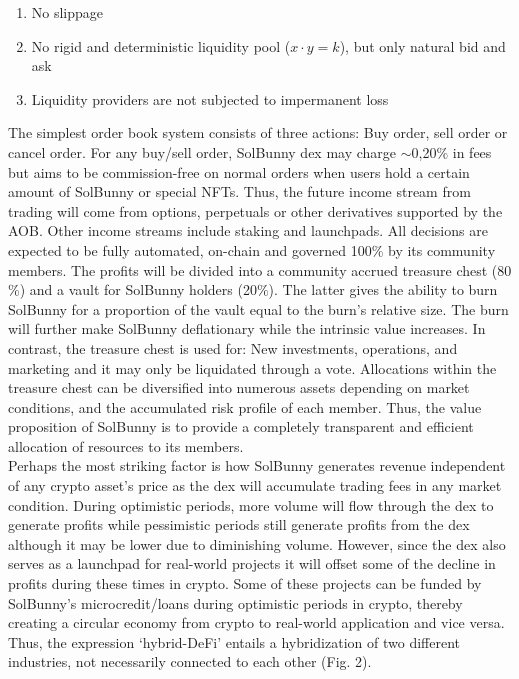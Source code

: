 \documentclass[12pt]{article}
\begin{document}
\begin{enumerate}

\item No slippage

\item No rigid and deterministic liquidity pool ($x \cdot y = k$), but only natural bid and ask

\item Liquidity providers are not subjected to impermanent loss\cite{il}

\end{enumerate}

The simplest order book system consists of three actions: Buy order, sell order or cancel order. For any buy/sell order, SolBunny dex may charge $\sim$0,20$\%$ in fees but aims to be commission-free on normal orders when users hold a certain amount of SolBunny or special NFTs. Thus, the future income stream from trading will come from options, perpetuals or other derivatives supported by the AOB. Other income streams include staking and launchpads. All decisions are expected to be fully automated, on-chain and governed 100$\%$ by its community members. The profits will be divided into a community accrued treasure chest (80$\%$) and a vault for SolBunny holders (20$\%$). The latter gives the ability to burn \cite{burn} SolBunny for a proportion of the vault equal to the burn's relative size. The burn will further make SolBunny deflationary while the intrinsic value increases. In contrast, the treasure chest is used for: New investments, operations, and marketing and it may only be liquidated through a vote. Allocations within the treasure chest can be diversified into numerous assets depending on market conditions, and the accumulated risk profile of each member. Thus, the value proposition of SolBunny is to provide a completely transparent and efficient allocation of resources to its members. \\

Perhaps the most striking factor is how SolBunny generates revenue independent of any crypto asset's price as the dex will accumulate trading fees in any market condition. During optimistic periods, more volume will flow through the dex to generate profits while pessimistic periods still generate profits from the dex although it may be lower due to diminishing volume. However, since the dex also serves as a launchpad for real-world projects it will offset some of the decline in profits during these times in crypto. Some of these projects can be funded by SolBunny’s microcredit/loans during optimistic periods in crypto, thereby creating a circular economy from crypto to real-world application and vice versa. Thus, the expression ‘hybrid-DeFi’ entails a hybridization of two different industries, not necessarily connected to each other (Fig. 2). 
\end{document}
